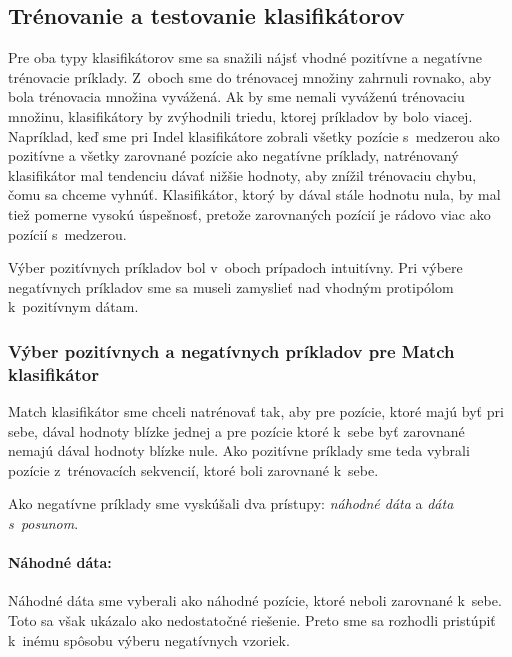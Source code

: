 \subsection{Trénovanie a testovanie klasifikátorov}
\label{subsec:clf-training}
Pre oba typy klasifikátorov sme sa snažili nájsť vhodné pozitívne a negatívne trénovacie príklady. Z~oboch sme do trénovacej množiny zahrnuli rovnako, aby bola trénovacia množina vyvážená. Ak by sme nemali vyváženú trénovaciu množinu, klasifikátory by zvýhodnili triedu, ktorej príkladov by bolo viacej. Napríklad, keď sme pri Indel klasifikátore zobrali všetky pozície s~medzerou ako pozitívne a všetky zarovnané pozície ako negatívne príklady, natrénovaný klasifikátor mal tendenciu dávať nižšie hodnoty, aby znížil trénovaciu chybu, čomu sa chceme vyhnúť. Klasifikátor, ktorý by dával stále hodnotu nula, by mal tiež pomerne vysokú úspešnosť, pretože zarovnaných pozícií je rádovo viac ako pozícií s~medzerou.

Výber pozitívnych príkladov bol v~oboch prípadoch intuitívny. Pri výbere negatívnych príkladov sme sa museli zamyslieť nad vhodným protipólom k~pozitívnym dátam.

\subsubsection{Výber pozitívnych a negatívnych príkladov pre Match klasifikátor}

Match klasifikátor sme chceli natrénovať tak, aby pre pozície, ktoré majú byť pri sebe, dával hodnoty blízke jednej a pre pozície ktoré k~sebe byť zarovnané nemajú dával hodnoty blízke nule.
Ako pozitívne príklady sme teda vybrali pozície z~trénovacích sekvencií, ktoré boli zarovnané k~sebe.

Ako negatívne príklady sme vyskúšali dva prístupy: \textit{náhodné dáta} a \textit{dáta s~posunom}.

\paragraph{Náhodné dáta:} Náhodné dáta sme vyberali ako náhodné pozície, ktoré neboli zarovnané k~sebe. Toto sa však ukázalo ako nedostatočné riešenie.
Preto sme sa rozhodli pristúpiť k~inému spôsobu výberu negatívnych vzoriek.

